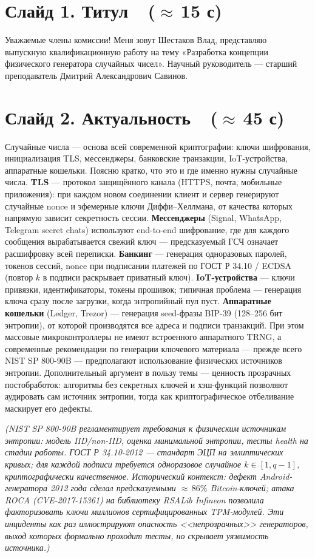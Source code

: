 \documentclass[12pt,a4paper]{extarticle}
\newcommand{\note}[1]{%
  \par
  {\small\color{noteclr}\itshape (#1)}%
  \par}
\begin{document}
\section*{Слайд 1. Титул~~($\approx$\,15 с)}

Уважаемые члены комиссии! Меня зовут Шестаков Влад, представляю выпускную
квалификационную работу на тему «Разработка концепции физического генератора
случайных чисел». Научный руководитель --- старший преподаватель Дмитрий
Александрович Савинов.

\section*{Слайд 2. Актуальность~~($\approx$\,45 с)}

Случайные числа --- основа всей современной криптографии: ключи шифрования,
инициализация TLS, мессенджеры, банковские транзакции, IoT-устройства,
аппаратные кошельки. Поясню кратко, что это и где именно нужны случайные числа.
\textbf{TLS} --- протокол защищённого канала (HTTPS, почта, мобильные
приложения): при каждом новом соединении клиент и сервер генерируют
случайные nonce и эфемерные ключи Диффи--Хеллмана, от качества которых
напрямую зависит секретность сессии. \textbf{Мессенджеры} (Signal, WhatsApp,
Telegram secret chats) используют end-to-end шифрование, где для каждого
сообщения вырабатывается свежий ключ --- предсказуемый ГСЧ означает
расшифровку всей переписки. \textbf{Банкинг} --- генерация
одноразовых паролей, токенов сессий, nonce при подписании платежей
по ГОСТ Р 34.10 / ECDSA (повтор $k$ в подписи раскрывает приватный ключ).
\textbf{IoT-устройства} --- ключи привязки, идентификаторы, токены прошивок;
типичная проблема --- генерация ключа сразу после загрузки, когда энтропийный
пул пуст. \textbf{Аппаратные кошельки} (Ledger, Trezor) --- генерация
seed-фразы BIP-39 (128--256 бит энтропии), от которой производятся все
адреса и подписи транзакций. При этом массовые микроконтроллеры не имеют
встроенного аппаратного TRNG, а современные рекомендации по генерации
ключевого материала --- прежде всего NIST SP 800-90B --- предполагают
использование физических источников энтропии. Дополнительный аргумент в
пользу темы --- ценность прозрачных постобработок: алгоритмы без секретных
ключей и хэш-функций позволяют аудировать сам источник энтропии, тогда как
криптографическое отбеливание маскирует его дефекты.

\note{NIST SP 800-90B регламентирует требования к физическим источникам
энтропии: модель IID/non-IID, оценка минимальной энтропии, тесты health на
стадии работы. ГОСТ Р 34.10-2012 --- стандарт ЭЦП на эллиптических кривых;
для каждой подписи требуется одноразовое случайное $k\in[1,q{-}1]$,
криптографически качественное. Исторический контекст: дефект Android-генератора
2012 года сделал предсказуемыми ${\approx}\,86\%$ Bitcoin-ключей; атака ROCA
(CVE-2017-15361) на библиотеку RSALib Infineon позволила факторизовать
ключи миллионов сертифицированных TPM-модулей. Эти инциденты как раз
иллюстрируют опасность <<непрозрачных>> генераторов, выход которых
формально проходит тесты, но скрывает уязвимость источника.}
\end{document}
